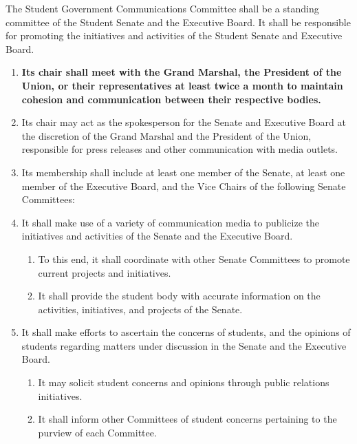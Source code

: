 \item The Student Government Communications Committee shall be a standing committee of the Student Senate and the Executive
Board. It shall be responsible for promoting the initiatives and activities of the Student Senate and Executive Board.
\begin{enumerate}
\item \textbf{Its chair shall meet with the Grand Marshal, the President of the Union, or their representatives at least twice a month to maintain cohesion and communication between their respective bodies.}
\item Its chair may act as the spokesperson for the Senate and Executive Board at the discretion of the Grand Marshal and the President of the Union, responsible for press releases and other communication with media outlets.
\item Its membership shall include at least one member of the Senate, at least one member of the Executive Board, and the Vice
Chairs of the following Senate Committees:
\item It shall make use of a variety of communication media to publicize the initiatives and activities of the Senate and the
Executive Board.
\begin{enumerate}
\item To this end, it shall coordinate with other Senate Committees to promote current projects and initiatives.
\item It shall provide the student body with accurate information on the activities, initiatives, and projects of the Senate.
\end{enumerate}
\item It shall make efforts to ascertain the concerns of students, and the opinions of students regarding matters under discussion
in the Senate and the Executive Board.
\begin{enumerate}
\item It may solicit student concerns and opinions through public relations initiatives.
\item It shall inform other Committees of student concerns pertaining to the purview of each Committee.
\end{enumerate}


\end{enumerate}
